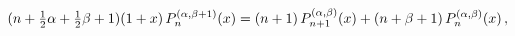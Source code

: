 \[(n+\tfrac{1}{2}\alpha+\tfrac{1}{2}\beta+1)(1+x)\mathop{P^{(\alpha,\beta+1)}_{n%
}\/}\nolimits\!\left(x\right)=(n+1)\mathop{P^{(\alpha,\beta)}_{n+1}\/}%
\nolimits\!\left(x\right)+(n+\beta+1)\mathop{P^{(\alpha,\beta)}_{n}\/}%
\nolimits\!\left(x\right),\]